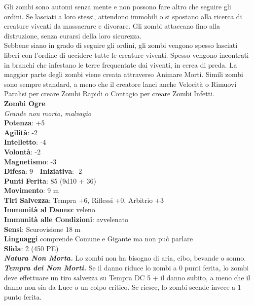 \begin{multicols}{2}
Gli zombi sono automi senza mente e non possono fare altro che seguire gli ordini. Se lasciati a loro stessi, attendono immobili o si spostano alla ricerca di creature viventi da massacrare e divorare. Gli zombi attaccano fino alla distruzione, senza curarsi della loro sicurezza.\\

Sebbene siano in grado di seguire gli ordini, gli zombi vengono spesso lasciati liberi con l’ordine di uccidere tutte le creature viventi. Spesso vengono incontrati in branchi che infestano le terre frequentate dai viventi, in cerca di preda. La maggior parte degli zombi viene creata attraverso Animare Morti. Simili zombi sono sempre standard, a meno che il creatore lanci anche Velocità o Rimuovi Paralisi per creare Zombi Rapidi o Contagio per creare Zombi Infetti.\\

\medskip\textbf{Zombi Ogre}\\
\emph{Grande non morto, malvagio}\\
\textbf{Potenza}: +5\\
\textbf{Agilità}: -2\\
\textbf{Intelletto}: -4\\
\textbf{Volontà}: -2\\
\textbf{Magnetismo}: -3\\
\textbf{Difesa}: 9 - \textbf{Iniziativa}: -2\\
\textbf{Punti Ferita}: 85 (9d10 + 36)\\
\textbf{Movimento}: 9 m\\
\textbf{Tiri Salvezza}: Tempra +6, Riflessi +0, Arbitrio +3\\
\textbf{Immunità al Danno}: veleno\\
\textbf{Immunità alle Condizioni}: avvelenato\\
\textbf{Sensi}: Scurovisione 18 m\\
\textbf{Linguaggi} comprende Comune e Gigante ma non può parlare\\
\textbf{Sfida}: 2 (450 PE)\smallskip\\
\emph{\textbf{Natura Non Morta.}} Lo zombi non ha bisogno di aria, cibo, bevande o sonno.\\
\emph{\textbf{Tempra dei Non Morti.}} Se il danno riduce lo zombi a 0 punti ferita, lo zombi deve effettuare un tiro salvezza su Tempra DC 5 + il danno subito, a meno che il danno non sia da Luce o un colpo critico. Se riesce, lo zombi scende invece a 1 punto ferita.\\


\end{multicols}
